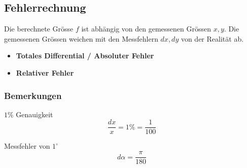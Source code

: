 \subsection{Fehlerrechnung}
    Die berechnete Grösse $f$ ist abhängig von den gemessenen Grössen $x,y$.
    Die gemessenen Grössen weichen mit den Messfehlern $dx,dy$ von der Realität ab.
    \begin{itemize}
        \item \textbf{Totales Differential / Absoluter Fehler}
        \item \textbf{Relativer Fehler}
    \end{itemize}
    \subsubsection{Bemerkungen}
        \vspace{0.5em}
        \begin{minipage}{0.54\linewidth}
            \centering \vspace{4pt}
            $1\%$ Genauigkeit
            $$
                \frac{dx}{x} = 1\% = \frac{1}{100}
            $$          
        \end{minipage}
        \begin{minipage}{0.45\linewidth}
            \centering
            Messfehler von $1^\circ$
            $$
                d\alpha = \frac{\pi}{180}
            $$
        \end{minipage}